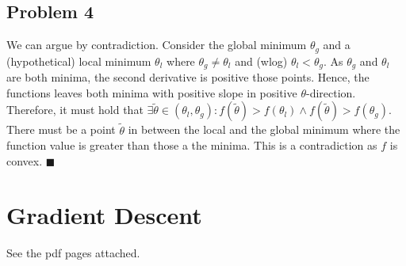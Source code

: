 \documentclass{scrartcl}
\newcommand{\qed}{\hfill $\blacksquare$}
\begin{document}
\subsection{Problem 4}
We can argue by contradiction. Consider the global minimum $\theta_g$ and a (hypothetical) local minimum $\theta_l$ where $\theta_g \neq \theta_l$ and (wlog) $\theta_l < \theta_g$. As $\theta_g$ and $\theta_l$ are both minima, the second derivative is positive those points. Hence, the functions leaves both minima with positive slope in positive $\theta$-direction. Therefore, it must hold that $\exists \tilde{\theta}\in(\theta_l, \theta_g): f(\tilde{\theta}) > f(\theta_l) \wedge f(\tilde{\theta}) > f(\theta_g)$.
There must be a point $\tilde{\theta}$ in between the local and the global minimum where the function value is greater than those a the minima. This is a contradiction as $f$ is convex. \qed


\section{Gradient Descent}
See the pdf pages attached.

\end{document}
